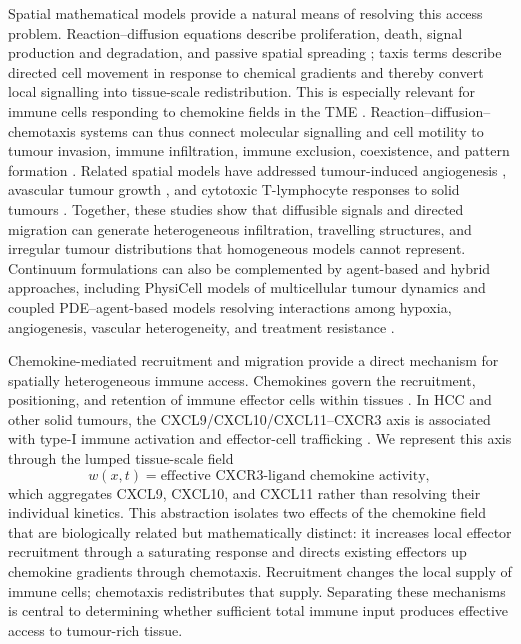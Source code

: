 \documentclass[]{interact}
\theoremstyle{plain}%
\theoremstyle{definition}
\theoremstyle{remark}
\begin{document}
Spatial mathematical models provide a natural means of resolving this access problem. Reaction--diffusion equations describe proliferation, death, signal production and degradation, and passive spatial spreading \cite{kondo2010reaction}; taxis terms describe directed cell movement in response to chemical gradients and thereby convert local signalling into tissue-scale redistribution. This is especially relevant for immune cells responding to chemokine fields in the TME \cite{mempel2024chemokines}. Reaction--diffusion--chemotaxis systems can thus connect molecular signalling and cell motility to tumour invasion, immune infiltration, immune exclusion, coexistence, and pattern formation
\cite{matzavinos2004mathematical,tao2024global,wang2026elliptic,li2026global,ai2015reaction,ke2022analysis,kiselev2022chemotaxis}. Related spatial models have addressed tumour-induced angiogenesis \cite{yu2026rigorous,hadjigeorgiou2024hybrid,anderson1998continuous,agosti2023image},
avascular tumour growth \cite{wang2026breakdown,roose2007mathematical,ferreira2002reaction,chaplain1996avascular},
and cytotoxic T-lymphocyte responses to solid tumours \cite{matzavinos2004mathematical}. Together, these studies show that diffusible signals and directed migration can generate heterogeneous infiltration, travelling structures, and irregular tumour distributions that homogeneous models cannot represent. Continuum formulations can also be complemented by
agent-based and hybrid approaches, including PhysiCell models of multicellular
tumour dynamics \cite{ghaffarizadeh2018physicell,cai2026optimal,savic2022heterogeneous} and
coupled PDE--agent-based models resolving interactions among hypoxia, angiogenesis, vascular heterogeneity, and treatment resistance \cite{wang2025analysis1}.

Chemokine-mediated recruitment and migration provide a direct mechanism for spatially heterogeneous immune access. Chemokines govern the recruitment, positioning, and retention of immune effector cells within tissues \cite{nagarsheth2017chemokines,chaudhary2025role,liang2025global,foeng2022harnessing}.
In HCC and other solid tumours, the CXCL9/CXCL10/CXCL11--CXCR3 axis is associated with type-I immune activation and effector-cell trafficking \cite{reschke2022cxcl9}. We represent this axis through the lumped tissue-scale field
\[
w(x,t)=\text{effective CXCR3-ligand chemokine activity},
\]
which aggregates CXCL9, CXCL10, and CXCL11 rather than resolving their individual kinetics. This abstraction isolates two effects of the chemokine field that are biologically related but mathematically distinct: it increases local effector recruitment through a saturating response and directs existing effectors up chemokine gradients through chemotaxis. Recruitment changes the local supply of immune cells; chemotaxis redistributes that supply. Separating these mechanisms is central to determining whether sufficient total immune input produces effective access to tumour-rich tissue.
\end{document}
